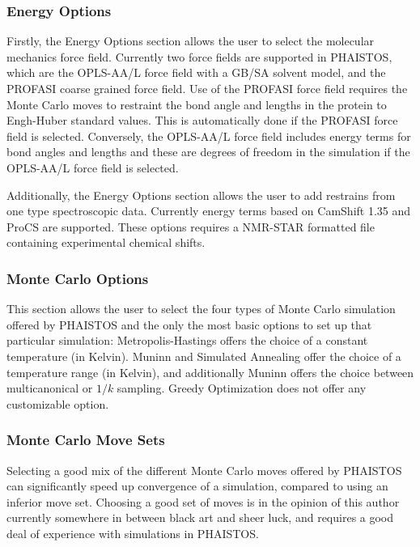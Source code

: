\subsubsection{Energy Options}

Firstly, the Energy Options section allows the user to select the molecular mechanics force field.
Currently two force fields are supported in PHAISTOS, which are the OPLS-AA/L force field with a GB/SA solvent model, and the PROFASI coarse grained force field.
Use of the PROFASI force field requires the Monte Carlo moves to restraint the bond angle and lengths in the protein to Engh-Huber standard values.
This is automatically done if the PROFASI force field is selected. 
Conversely, the OPLS-AA/L force field includes energy terms for bond angles and lengths and these are degrees of freedom in the simulation if the OPLS-AA/L force field is selected.

Additionally, the Energy Options section allows the user to add restrains from one type spectroscopic data.
Currently energy terms based on CamShift 1.35 and ProCS are supported.
These options requires a NMR-STAR formatted file containing experimental chemical shifts.


\subsubsection{Monte Carlo Options}

This section allows the user to select the four types of Monte Carlo simulation offered by PHAISTOS and the only the most basic options to set up that particular simulation:
Metropolis-Hastings offers the choice of a constant temperature (in Kelvin).
Muninn and Simulated Annealing offer the choice of a temperature range (in Kelvin), and additionally Muninn offers the choice between multicanonical or $1/k$ sampling.
Greedy Optimization does not offer any customizable option. 

\subsubsection{Monte Carlo Move Sets}

Selecting a good mix of the different Monte Carlo moves offered by PHAISTOS can significantly speed up convergence of a simulation, compared to using an inferior move set.
Choosing a good set of moves is in the opinion of this author currently somewhere in between black art and sheer luck, and requires a good deal of experience with simulations in PHAISTOS.

